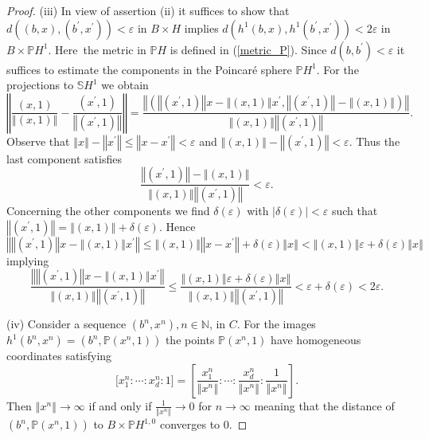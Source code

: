\begin{proof}
		(iii) In view of assertion (ii) it suffices to show that $d((b,x),(b^{\prime
		},x^{\prime}))<\varepsilon$ in $B\times H$ implies $d(h^{1}(b,x),h^{1}%
		(b^{\prime},x^{\prime}))<2\varepsilon$ in $B\times\mathbb{P}H^{1}$. Here\ the
		metric in $\mathbb{P}H$ is defined in (\ref{metric_P}).\textbf{ }Since
		$d(b,b^{\prime})<\varepsilon$ it suffices to estimate the components in the
		Poincar\'{e} sphere $\mathbb{P}H^{1}$. For the projections to $\mathbb{S}%
		H^{1}$ we obtain
		\[
		\left\Vert \frac{(x,1)}{\left\Vert (x,1)\right\Vert }-\frac{(x^{\prime}%
			,1)}{\left\Vert (x^{\prime},1)\right\Vert }\right\Vert =\frac{\left\Vert
			\left(  \left\Vert (x^{\prime},1)\right\Vert x-\left\Vert (x,1)\right\Vert
			x^{\prime},\left\Vert (x^{\prime},1)\right\Vert -\left\Vert (x,1)\right\Vert
			\right)  \right\Vert }{\left\Vert (x,1)\right\Vert \left\Vert (x^{\prime
			},1)\right\Vert }.
		\]
		Observe that $\left\Vert x\right\Vert -\left\Vert x^{\prime}\right\Vert
		\leq\left\Vert x-x^{\prime}\right\Vert <\varepsilon$ and $\left\Vert
		(x,1)\right\Vert -\left\Vert (x^{\prime},1)\right\Vert <\varepsilon$. Thus the
		last component satisfies%
		\[
		\frac{\left\Vert (x^{\prime},1)\right\Vert -\left\Vert (x,1)\right\Vert
		}{\left\Vert (x,1)\right\Vert \left\Vert (x^{\prime},1)\right\Vert
		}<\varepsilon.
		\]
		Concerning the other components we find $\delta(\varepsilon)$ with $\left\vert
		\delta(\varepsilon)\right\vert <\varepsilon$ such that $\left\Vert (x^{\prime
		},1)\right\Vert =\left\Vert (x,1)\right\Vert +\delta(\varepsilon)$. Hence%
		\[
		\left\Vert \left\Vert (x^{\prime},1)\right\Vert x-\left\Vert (x,1)\right\Vert
		x^{\prime}\right\Vert \leq\left\Vert (x,1)\right\Vert \left\Vert x-x^{\prime
		}\right\Vert +\delta(\varepsilon)\left\Vert x\right\Vert <\left\Vert
		(x,1)\right\Vert \varepsilon+\delta(\varepsilon)\left\Vert x\right\Vert
		\]
		implying%
		\[
		\frac{\left\Vert \left\Vert (x^{\prime},1)\right\Vert x-\left\Vert
			(x,1)\right\Vert x^{\prime}\right\Vert }{\left\Vert (x,1)\right\Vert
			\left\Vert (x^{\prime},1)\right\Vert }\leq\frac{\left\Vert (x,1)\right\Vert
			\varepsilon+\delta(\varepsilon)\left\Vert x\right\Vert }{\left\Vert
			(x,1)\right\Vert \left\Vert (x^{\prime},1)\right\Vert }<\varepsilon
		+\delta(\varepsilon)<2\varepsilon.
		\]
		
		
		(iv) Consider a sequence $(b^{n},x^{n}),n\in\mathbb{N}$, in $C$. For the
		images $h^{1}(b^{n},x^{n})=(b^{n},\mathbb{P}(x^{n},1))$ the points
		$\mathbb{P}(x^{n},1)$ have homogeneous coordinates satisfying
		\[
		\lbrack x_{1}^{n}:\cdots:x_{d}^{n}:1]=\left[  \frac{x_{1}^{n}}{\left\Vert
			x^{n}\right\Vert }:\cdots:\frac{x_{d}^{n}}{\left\Vert x^{n}\right\Vert }%
		:\frac{1}{\left\Vert x^{n}\right\Vert }\right]  .
		\]
		Then $\left\Vert x^{n}\right\Vert \rightarrow\infty$ if and only if $\frac
		{1}{\left\Vert x^{n}\right\Vert }\rightarrow0$ for $n\rightarrow\infty$
		meaning that the distance of $(b^{n},\mathbb{P}(x^{n},1))$ to $B\times
		\mathbb{P}H^{1,0}$ converges to $0$.
	\end{proof}
	
